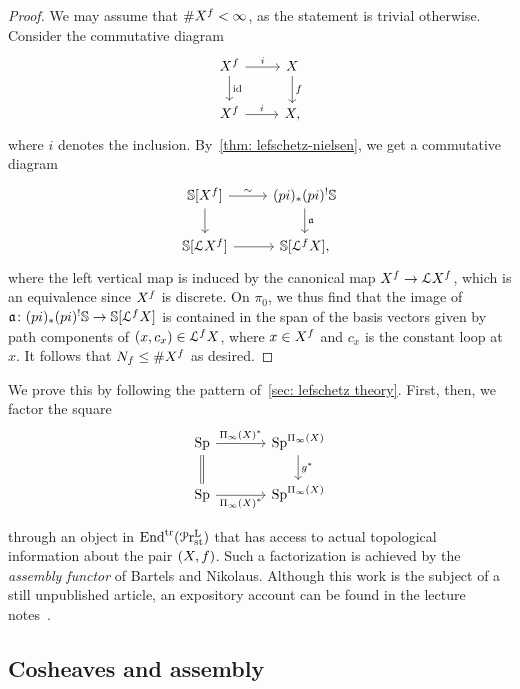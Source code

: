 \begin{proof}
  We may assume that $\# X^f < \infty$, as the statement is trivial otherwise. Consider the commutative diagram
  \[
    \begin{tikzcd}
      \tset^f\arrow[d,"\id"]\arrow[r,"i"] & \tset\arrow[d,"f"] \\
      \tset^f\arrow[r,"i"] & \tset,
    \end{tikzcd}
  \]
  where $i$ denotes the inclusion. By~\cref{thm: lefschetz-nielsen}, we get a commutative diagram
  \[
    \begin{tikzcd}
      \SS\lbrack \tset^f\rbrack \arrow[d] \arrow[r,"\sim"] & (pi)_*(pi)^!\SS\arrow[d,"\mathfrak a"] \\
      \SS\lbrack\cL \tset^f\rbrack\arrow[r] & \SS\lbrack\cL^f\tset\rbrack,
    \end{tikzcd}
  \]
  where the left vertical map is induced by the canonical map $X^f\to\mathcal{L} X^f$, which is an equivalence since $X^f$ is discrete. On $\pi_0$, we thus find that the image of $\mathfrak a\colon (pi)_*(pi)^!\mathbb{S}\to \mathbb{S}\lbrack\mathcal{L}^fX\rbrack$ is contained in the span of the basis vectors given by path components of $(x,c_x)\in\mathcal{L}^fX$, where $x\in X^f$ and $c_x$ is the constant loop at $x$. It follows that $N_f\leq\# X^f$ as desired.
\end{proof}

\newpage

 We prove this by following the pattern of~\cref{sec: lefschetz theory}. First, then, we factor the square
\begin{equation}
  \label{eq:lax-comm-square-reidemeister}
  \begin{tikzcd}[column sep=large]
    \Sp \arrow[r,"\ani{\tset}^*"] \arrow[d,equal] & \Sp^{\ani{\tset}} \arrow[d,"g^*"]\\
    \Sp \arrow[r,swap,"\ani{\tset} ^*"] & \Sp^{\ani{\tset}}
  \end{tikzcd}
\end{equation}

through an object in $\mathrm{End}^{\mathrm{tr}}(\mathcal{P}\mathrm{r}^{\mathrm{L}}_{\mathrm{st}})$ that has access to actual topological information about the pair $(X,f)$. Such a factorization is achieved by the {\em assembly functor} of Bartels and Nikolaus. Although this work is the subject of a still unpublished article, an expository account can be found in the lecture notes~\cite{Nikolaus2024}.

\subsection{Cosheaves and assembly}

